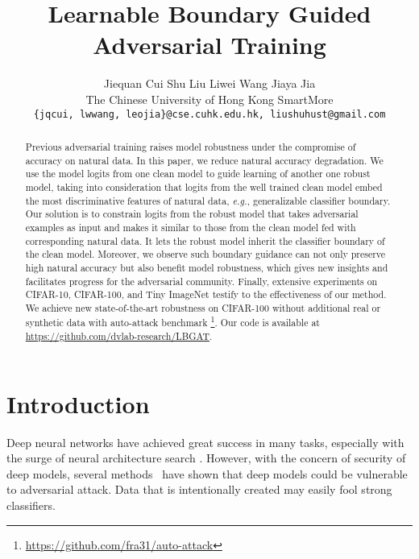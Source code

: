 \documentclass[10pt,twocolumn,letterpaper]{article}
\begin{document}
\title{Learnable Boundary Guided Adversarial Training}

\author{
	Jiequan Cui  \quad 
	Shu Liu  \quad
	Liwei Wang  \quad
	Jiaya Jia  \\
	The Chinese University of Hong Kong \hspace{1cm} SmartMore \hspace{1cm} 
	\vspace{.7em}\\
	{\tt\small \{jqcui, lwwang, leojia\}@cse.cuhk.edu.hk, liushuhust@gmail.com}
}

\maketitle
\ificcvfinal\thispagestyle{empty}\fi

\begin{abstract}
   Previous adversarial training raises model robustness under the compromise of accuracy on natural data. In this paper, we reduce natural accuracy degradation. We use the model logits from one clean model to guide learning of another one robust model, taking into consideration that logits from the well trained clean model embed the most discriminative features of natural data, {\it e.g.}, generalizable classifier boundary. Our solution is to constrain logits from the robust model that takes adversarial examples as input and makes it similar to those from the clean model fed with corresponding natural data. It lets the robust model inherit the classifier boundary of the clean model. Moreover, we observe such boundary guidance can not only preserve high natural accuracy but also benefit model robustness, which gives new insights and facilitates progress for the adversarial community. Finally, extensive experiments on CIFAR-10, CIFAR-100, and Tiny ImageNet testify to the effectiveness of our method. We achieve new state-of-the-art robustness on CIFAR-100 without additional real or synthetic data with auto-attack benchmark \footnote{\url{https://github.com/fra31/auto-attack}}. Our code is available at \url{https://github.com/dvlab-research/LBGAT}.
\end{abstract}

\section{Introduction}
Deep neural networks have achieved great success in many tasks, especially with the surge of neural architecture search \cite{DBLP:conf/cvpr/ZophVSL18, DBLP:conf/iclr/LiuSY19, DBLP:conf/cvpr/TanCPVSHL19, DBLP:conf/iccv/CuiCLLSJ19, DBLP:conf/iclr/CaiGWZH20}. However, with the concern of security of deep models, several methods~\cite{DBLP:conf/cvpr/DongLPS0HL18,Xie_2019_CVPR,DBLP:journals/corr/SzegedyZSBEGF13,Shi_2019_CVPR,DBLP:conf/iclr/TramerKPGBM18,DBLP:conf/aaai/ZhengC019,DBLP:conf/iclr/TramerKPGBM18,DBLP:conf/cvpr/HeZRS16,DBLP:conf/cvpr/HuangLMW17,DBLP:journals/corr/SimonyanZ14a} have shown that deep models could be vulnerable to adversarial attack. Data that is intentionally created may easily fool strong classifiers. 
\end{document}
